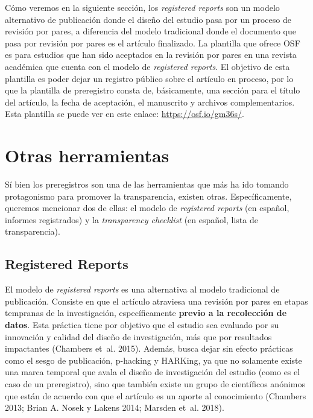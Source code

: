 \documentclass[
  spanish,
  letterpaper,
  DIV=11,
  numbers=noendperiod]{scrreprt}
\begin{document}
Cómo veremos en la siguiente sección, los \emph{registered reports} son
un modelo alternativo de publicación donde el diseño del estudio pasa
por un proceso de revisión por pares, a diferencia del modelo
tradicional donde el documento que pasa por revisión por pares es el
artículo finalizado. La plantilla que ofrece OSF es para estudios que
han sido aceptados en la revisión por pares en una revista académica que
cuenta con el modelo de \emph{registered reports}. El objetivo de esta
plantilla es poder dejar un registro público sobre el artículo en
proceso, por lo que la plantilla de preregistro consta de, básicamente,
una sección para el título del artículo, la fecha de aceptación, el
manuscrito y archivos complementarios. Esta plantilla se puede ver en
este enlace: \url{https://osf.io/gm36s/}.

\section{Otras herramientas}\label{otras-herramientas}

Sí bien los preregistros son una de las herramientas que más ha ido
tomando protagonismo para promover la transparencia, existen otras.
Específicamente, queremos mencionar dos de ellas: el modelo de
\emph{registered reports} (en español, informes registrados) y la
\emph{transparency checklist} (en español, lista de transparencia).

\subsection{Registered Reports}\label{registered-reports}

El modelo de \emph{registered reports} es una alternativa al modelo
tradicional de publicación. Consiste en que el artículo atraviesa una
revisión por pares en etapas tempranas de la investigación,
específicamente \textbf{previo a la recolección de datos}. Esta práctica
tiene por objetivo que el estudio sea evaluado por su innovación y
calidad del diseño de investigación, más que por resultados impactantes
(Chambers et~al. 2015). Además, busca dejar sin efecto prácticas como el
sesgo de publicación, p-hacking y HARKing, ya que no solamente existe
una marca temporal que avala el diseño de investigación del estudio
(como es el caso de un preregistro), sino que también existe un grupo de
científicos anónimos que están de acuerdo con que el artículo es un
aporte al conocimiento (Chambers 2013; Brian A. Nosek y Lakens 2014;
Marsden et~al. 2018).
\end{document}

